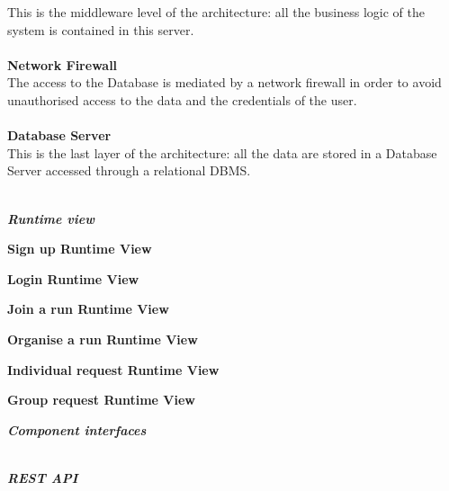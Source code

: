 \begin{legal}
This is the middleware level of the architecture: all the business logic of
the system is contained in this server.\\\\
		\textbf{Network Firewall}\\
The access to the Database is mediated by a network firewall in order to
avoid unauthorised access to the data and the credentials of the user.\\\\
		\textbf{Database Server}\\
This is the last layer of the architecture: all the data are stored in a Database Server accessed through a relational DBMS. \\\\

		\item \textit{\textbf{Runtime view}}\\
			\begin{legal}
				\item \textbf{Sign up Runtime View}\\
				\item \textbf{Login Runtime View}\\
				\item \textbf{Join a run Runtime View}\\
				\item \textbf{Organise a run Runtime View}\\
				\item \textbf{Individual request Runtime View}\\
				\item \textbf{Group request Runtime View}\\
			\end {legal}
		\item \textit{\textbf{Component interfaces}}\\\\
			\begin{legal} 
				\item \textit{\textbf{REST API}}\\\\

\end{legal}
\end{legal}
